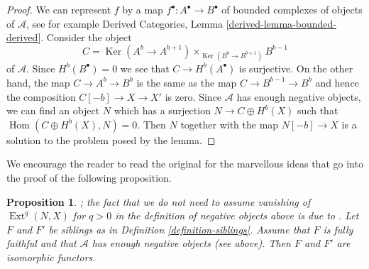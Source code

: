 \documentclass{stacks-project}
\newenvironment{reference}{\comment}{\endcomment}
\theoremstyle{plain}
\newtheorem{proposition}[subsection]{Proposition}
\theoremstyle{definition}
\theoremstyle{remark}
\numberwithin{equation}{subsection}
\def\Hom{\mathop{\mathrm{Hom}}\nolimits}
\def\Ext{\mathop{\mathrm{Ext}}\nolimits}
\def\Ker{\mathop{\mathrm{Ker}}}
\begin{document}
\begin{proof}
We can represent $f$ by a map $f^\bullet : A^\bullet \to B^\bullet$
of bounded complexes of objects of $\mathcal{A}$, see for example
Derived Categories, Lemma \ref{derived-lemma-bounded-derived}.
Consider the object
$$
C = \Ker(A^b \to A^{b + 1}) \times_{\Ker(B^b \to B^{b + 1})} B^{b - 1}
$$
of $\mathcal{A}$. Since $H^b(B^\bullet) = 0$ we see that
$C \to H^b(A^\bullet)$ is surjective. On the other hand, the map
$C \to A^b \to B^b$ is the same as the map $C \to B^{b - 1} \to B^b$
and hence the composition $C[-b] \to X \to X'$ is zero.
Since $\mathcal{A}$ has enough negative objects, we can find an object $N$
which has a surjection $N \to C \oplus H^b(X)$ such that
$\Hom(C \oplus H^b(X), N) = 0$. Then $N$ together with the map
$N[-b] \to X$ is a solution to the problem posed by the lemma.
\end{proof}

\noindent
We encourage the reader to read the original
\cite[Proposition 2.16]{Orlov-K3} for the marvellous ideas
that go into the proof of the following proposition.

\begin{proposition}
\label{proposition-siblings-isomorphic}
\begin{reference}
\cite[Proposition 2.16]{Orlov-K3}; the fact that we do not need
to assume vanishing of $\Ext^q(N, X)$ for $q > 0$ in the definition
of negative objects above is due to \cite{Canonaco-Stellari}.
\end{reference}
Let $F$ and $F'$ be siblings as in Definition \ref{definition-siblings}.
Assume that $F$ is fully faithful and that $\mathcal{A}$ has enough
negative objects (see above). Then $F$ and $F'$ are isomorphic functors.
\end{proposition}
\end{document}
